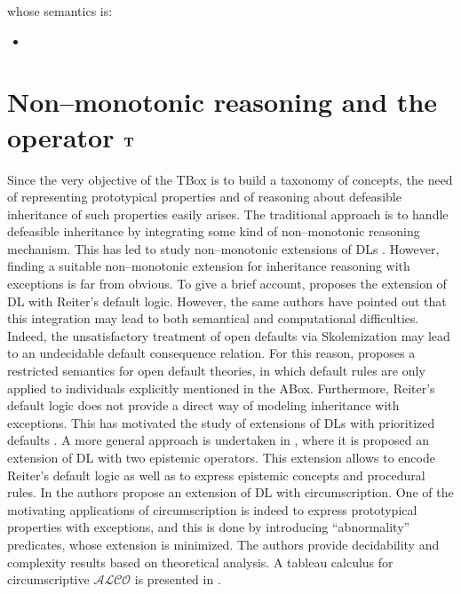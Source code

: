 \documentclass[a4paper, 11pt, oneside]{duthesis}
\newcommand{\itab}[1]{\hspace{0em}\rlap{#1}}
\newcommand{\tip}{{\bf T}}
\newcommand{\II} {\mathcal{I}}
\begin{document}
whose semantics is:
\begin{itemize}
\item[] \itab{$(\neg C)^{\II} = \Delta^{\II} $\textbackslash $C^{\II}$}
\end{itemize}
\cite{obitko}


\section{Non--monotonic reasoning and the operator $\tip$}\label{nonmonotonic_reasoning}
Since the very objective of the TBox is to build a taxonomy of concepts, the need of representing prototypical properties and of reasoning about defeasible inheritance of such properties easily arises.
The traditional approach is to handle defeasible inheritance by integrating some kind of non--monotonic reasoning mechanism.
This has led to study non--monotonic extensions of DLs \cite{baader95a, baader95b, bonattilutzwolterkr06, casinistraccia2010, donini98, donini2002, eiter2004, straccia93}.
However, finding a suitable non--monotonic extension for inheritance reasoning with exceptions is far from obvious.
To give a brief account, \cite{baader95a} proposes the extension of DL with Reiter's default logic.
However, the same authors have pointed out that this integration may lead to both semantical and computational difficulties.
Indeed, the unsatisfactory treatment of open defaults via Skolemization may lead to an undecidable default consequence relation. For this reason, \cite{baader95a} proposes a restricted semantics for open default theories, in which default rules are only applied to individuals explicitly mentioned in the ABox.
Furthermore, Reiter's default logic does not provide a direct way of modeling inheritance with exceptions.
This has motivated the study of extensions of DLs with prioritized defaults
\cite{straccia93,baader95b}.
A more general approach is undertaken in \cite{donini2002}, where it is proposed an extension of DL with two epistemic operators. This extension allows to encode Reiter's default logic as well as to express epistemic concepts and procedural rules.
In \cite{bonattilutz} the authors propose an extension of DL with circumscription. One of the motivating applications of circumscription is indeed to express prototypical properties with exceptions, and this is done by introducing ``abnormality'' predicates, whose extension is minimized.
The authors provide decidability and complexity results based on theoretical analysis.
A tableau calculus for circumscriptive $\mathcal{ALCO}$ is presented in \cite{hitzlertableau}.
\end{document}

